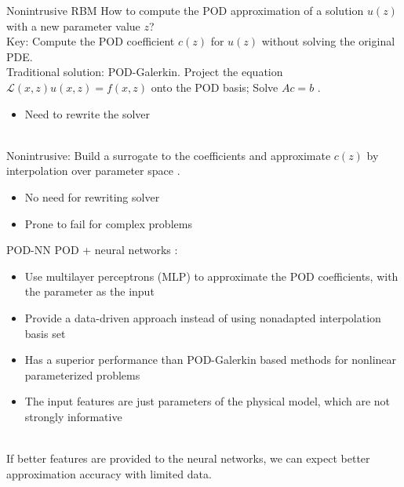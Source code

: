 \documentclass[10pt]{beamer}
\newcommand{\cmark}{\ding{51}}
\newcommand{\xmark}{\ding{55}}
\begin{document}
\begin{frame}{Nonintrusive RBM}
How to compute the POD approximation of a solution $u(z)$ with a {\color{red} new} parameter value $z$?\\[10pt]

Key: Compute the POD coefficient $c(z)$ for $u(z)$ {\color{red} without} solving the original PDE. \\[10pt]

Traditional solution: POD-Galerkin. Project the equation $\mathcal{L}(x, z)u(x, z) = f(x, z)$ onto the POD basis; Solve $Ac = b$ \cite{maday2006reduced,rozza2007reduced,buffa2012priori}.
\begin{itemize}
\item[\xmark] Need to rewrite the solver
\end{itemize}\\[10pt]

Nonintrusive: Build a surrogate to the coefficients and approximate $c(z)$ by interpolation over parameter space \cite{xiao2015non,xiao2016non,xiao2017parameterized,garotta2018reduced}.
\begin{itemize}
\item[\cmark] No need for rewriting solver
\item[\xmark] Prone to fail for complex problems
\end{itemize}
\end{frame}


\begin{frame}{POD-NN}
POD + neural networks \cite{hesthaven2018non}: \\[10pt]
\begin{itemize}
\item[\cmark] Use multilayer perceptrons (MLP) to approximate the POD coefficients, with the parameter as the input
\item[\cmark] Provide a data-driven approach instead of using nonadapted interpolation basis set
\item[\cmark] Has a superior performance than POD-Galerkin based methods for nonlinear parameterized problems
\item[\xmark] The input features are just parameters of the physical model, which are not strongly informative
\end{itemize}
\\[10pt]
If {\color{red} better} features are provided to the neural networks, we can expect better approximation accuracy with {\color{red} limited} data.
\end{frame}
\end{document}
